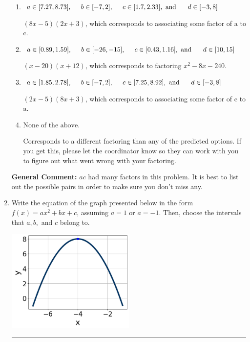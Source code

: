 \documentclass{extbook}[14pt]
\newcommand{\litem}[1]{\item #1

\rule{\textwidth}{0.4pt}}
\begin{document}
\begin{enumerate}
{\begin{enumerate}[label=\Alph*.]
* $(4x -5)(4x + 3)$, which is the correct option.
\item \( a \in [7.27, 8.73], \hspace*{5mm} b \in [-7, 2], \hspace*{5mm} c \in [1.7, 2.33], \text{ and } \hspace*{5mm} d \in [-3, 8] \)

 $(8x -5)(2x + 3)$, which corresponds to associating some factor of a to c.
\item \( a \in [0.89, 1.59], \hspace*{5mm} b \in [-26, -15], \hspace*{5mm} c \in [0.43, 1.16], \text{ and } \hspace*{5mm} d \in [10, 15] \)

 $(x -20)(x + 12)$, which corresponds to factoring $x^{2} -8 x -240$.
\item \( a \in [1.85, 2.78], \hspace*{5mm} b \in [-7, 2], \hspace*{5mm} c \in [7.25, 8.92], \text{ and } \hspace*{5mm} d \in [-3, 8] \)

 $(2x -5)(8x + 3)$, which corresponds to associating some factor of c to a.
\item \( \text{None of the above.} \)

 Corresponds to a different factoring than any of the predicted options. If you get this, please let the coordinator know so they can work with you to figure out what went wrong with your factoring.
\end{enumerate}

\textbf{General Comment:} $ac$ had many factors in this problem. It is best to list out the possible pairs in order to make sure you don't miss any.
}
\litem{
Write the equation of the graph presented below in the form $f(x)=ax^2+bx+c$, assuming  $a=1$ or $a=-1$. Then, choose the intervals that $a, b,$ and $c$ belong to.

\begin{center}
    \includegraphics[width=0.5\textwidth]{../Figures/quadraticGraphToEquationCopyB.png}
\end{center}


}
\end{enumerate}
\end{document}
